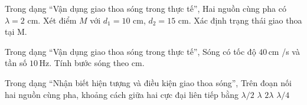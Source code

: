 \begin{ex}
Trong dạng “Vận dụng giao thoa sóng trong thực tế”, Hai nguồn cùng pha có $\lambda=2$ cm. Xét điểm $M$ với $d_1=10$ cm, $d_2=15$ cm. Xác định trạng thái giao thoa tại M.
\choiceTF

\end{ex}

\begin{ex}
Trong dạng “Vận dụng giao thoa sóng trong thực tế”, Sóng có tốc độ $40\,\text{cm}$ /s và tần số $10\,\text{Hz}$. Tính bước sóng theo cm.
\end{ex}

\begin{ex}
Trong dạng “Nhận biết hiện tượng và điều kiện giao thoa sóng”, Trên đoạn nối hai nguồn cùng pha, khoảng cách giữa hai cực đại liên tiếp bằng
\choice
{\True $\lambda/2$}
{$\lambda$}
{$2\lambda$}
{$\lambda/4$}
\end{ex}

